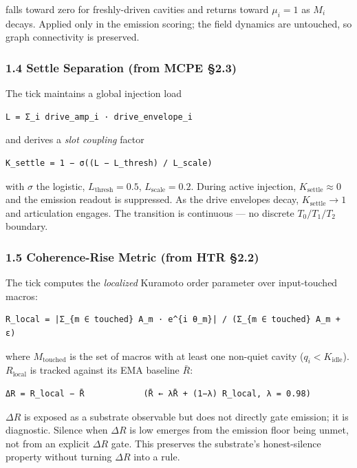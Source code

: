 \documentclass[
  11pt,
  a4paper,
]{article}
\begin{document}
falls toward zero for freshly-driven cavities and returns toward
\(\mu_i = 1\) as \(M_i\) decays. Applied only in the emission scoring;
the field dynamics are untouched, so graph connectivity is preserved.

\subsubsection{1.4 Settle Separation (from MCPE
§2.3)}\label{settle-separation-from-mcpe-2.3}

The tick maintains a global injection load

\begin{verbatim}
L = Σ_i drive_amp_i · drive_envelope_i
\end{verbatim}

and derives a \emph{slot coupling} factor

\begin{verbatim}
K_settle = 1 − σ((L − L_thresh) / L_scale)
\end{verbatim}

with \(\sigma\) the logistic, \(L_{\text{thresh}} = 0.5\),
\(L_{\text{scale}} = 0.2\). During active injection,
\(K_{\text{settle}} \approx 0\) and the emission readout is suppressed.
As the drive envelopes decay, \(K_{\text{settle}} \to 1\) and
articulation engages. The transition is continuous --- no discrete
\(T_0 / T_1 / T_2\) boundary.

\subsubsection{1.5 Coherence-Rise Metric (from HTR
§2.2)}\label{coherence-rise-metric-from-htr-2.2}

The tick computes the \emph{localized} Kuramoto order parameter over
input-touched macros:

\begin{verbatim}
R_local = |Σ_{m ∈ touched} A_m · e^{i θ_m}| / (Σ_{m ∈ touched} A_m + ε)
\end{verbatim}

where \(M_{\text{touched}}\) is the set of macros with at least one
non-quiet cavity (\(q_i < K_{\text{idle}}\)). \(R_{\text{local}}\) is
tracked against its EMA baseline \(\bar R\):

\begin{verbatim}
ΔR = R_local − R̄            (R̄ ← λR̄ + (1−λ) R_local, λ = 0.98)
\end{verbatim}

\(\Delta R\) is exposed as a substrate observable but does not directly
gate emission; it is diagnostic. Silence when \(\Delta R\) is low
emerges from the emission floor being unmet, not from an explicit
\(\Delta R\) gate. This preserves the substrate's honest-silence
property without turning \(\Delta R\) into a rule.
\end{document}
